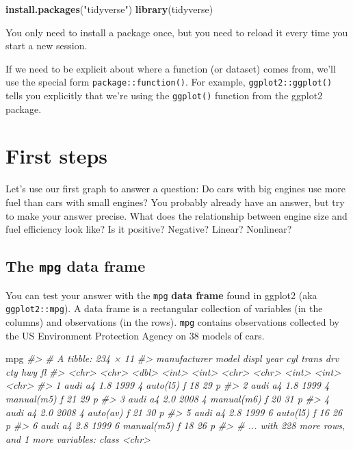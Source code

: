 \documentclass[]{book}
\newenvironment{Shaded}{\begin{snugshade}}{\end{snugshade}}
\newcommand{\KeywordTok}[1]{\textcolor[rgb]{0.13,0.29,0.53}{\textbf{{#1}}}}
\newcommand{\StringTok}[1]{\textcolor[rgb]{0.31,0.60,0.02}{{#1}}}
\newcommand{\CommentTok}[1]{\textcolor[rgb]{0.56,0.35,0.01}{\textit{{#1}}}}
\newcommand{\NormalTok}[1]{{#1}}
\begin{document}
\begin{Shaded}
\begin{Highlighting}[]
\KeywordTok{install.packages}\NormalTok{(}\StringTok{"tidyverse"}\NormalTok{)}
\KeywordTok{library}\NormalTok{(tidyverse)}
\end{Highlighting}
\end{Shaded}

You only need to install a package once, but you need to reload it every
time you start a new session.

If we need to be explicit about where a function (or dataset) comes
from, we'll use the special form \texttt{package::function()}. For
example, \texttt{ggplot2::ggplot()} tells you explicitly that we're
using the \texttt{ggplot()} function from the ggplot2 package.

\section{First steps}\label{first-steps}

Let's use our first graph to answer a question: Do cars with big engines
use more fuel than cars with small engines? You probably already have an
answer, but try to make your answer precise. What does the relationship
between engine size and fuel efficiency look like? Is it positive?
Negative? Linear? Nonlinear?

\subsection{\texorpdfstring{The \texttt{mpg} data
frame}{The mpg data frame}}\label{the-mpg-data-frame}

You can test your answer with the \texttt{mpg} \textbf{data frame} found
in ggplot2 (aka \texttt{ggplot2::mpg}). A data frame is a rectangular
collection of variables (in the columns) and observations (in the rows).
\texttt{mpg} contains observations collected by the US Environment
Protection Agency on 38 models of cars.

\begin{Shaded}
\begin{Highlighting}[]
\NormalTok{mpg}
\CommentTok{#> # A tibble: 234 × 11}
\CommentTok{#>   manufacturer model displ  year   cyl      trans   drv   cty   hwy    fl}
\CommentTok{#>          <chr> <chr> <dbl> <int> <int>      <chr> <chr> <int> <int> <chr>}
\CommentTok{#> 1         audi    a4   1.8  1999     4   auto(l5)     f    18    29     p}
\CommentTok{#> 2         audi    a4   1.8  1999     4 manual(m5)     f    21    29     p}
\CommentTok{#> 3         audi    a4   2.0  2008     4 manual(m6)     f    20    31     p}
\CommentTok{#> 4         audi    a4   2.0  2008     4   auto(av)     f    21    30     p}
\CommentTok{#> 5         audi    a4   2.8  1999     6   auto(l5)     f    16    26     p}
\CommentTok{#> 6         audi    a4   2.8  1999     6 manual(m5)     f    18    26     p}
\CommentTok{#> # ... with 228 more rows, and 1 more variables: class <chr>}
\end{Highlighting}
\end{Shaded}
\end{document}
